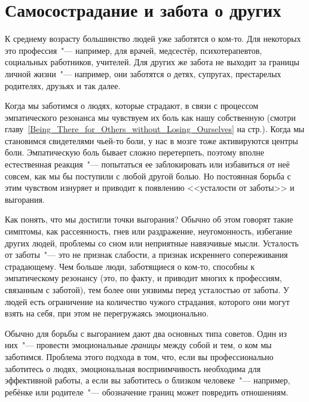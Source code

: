 
\chapter{Самосострадание и забота о других} \label{Self-Compassion_for_Caregivers}

К среднему возрасту большинство людей уже заботятся о ком-то. Для некоторых это профессия~"--- например, для врачей, медсестёр, психотерапевтов, социальных работников, учителей. Для других же забота не выходит за границы личной жизни~"--- например, они заботятся о детях, супругах, престарелых родителях, друзьях и так далее.

Когда мы заботимся о людях, которые страдают, в связи с процессом эмпатического резонанса мы чувствуем их боль как нашу собственную (смотри главу~\ref{Being_There_for_Others_without_Losing_Ourselves} на стр.\:\pageref{Being_There_for_Others_without_Losing_Ourselves}). Когда мы становимся свидетелями чьей-то боли, у нас в мозге тоже активируются центры боли\cite{99}. Эмпатическую боль бывает сложно перетерпеть, поэтому вполне естественная реакция~"--- попытаться ее заблокировать или избавиться от неё совсем, как мы бы поступили с любой другой болью. Но постоянная борьба с этим чувством изнуряет и приводит к появлению <<усталости от заботы>> и выгорания.

Как понять, что мы достигли точки выгорания? Обычно об этом говорят такие симптомы, как рассеянность, гнев или раздражение, неугомонность, избегание других людей, проблемы со сном или неприятные навязчивые мысли\cite{100}. Усталость от заботы~"--- это не признак слабости, а признак искреннего сопереживания страдающему. Чем больше люди, заботящиеся о ком-то, способны к эмпатическому резонансу (это, по факту, и приводит многих к профессиям, связанным с заботой), тем более они уязвимы перед усталостью от заботы\cite{101}. У людей есть ограничение на количество чужого страдания, которого они могут взять на себя, при этом не перегружаясь эмоционально.

Обычно для борьбы с выгоранием дают два основных типа советов. Один из них~"--- провести эмоциональные \emph{границы} между собой и тем, о ком мы заботимся. Проблема этого подхода в том, что, если вы профессионально заботитесь о людях, эмоциональная восприимчивость необходима для эффективной работы, а если вы заботитесь о близком человеке~"--- например, ребёнке или родителе~"--- обозначение границ может повредить отношениям. 

